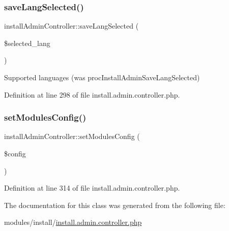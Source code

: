 \subsubsection{\texorpdfstring{save\+Lang\+Selected()}{saveLangSelected()}}
{\footnotesize\ttfamily install\+Admin\+Controller\+::save\+Lang\+Selected (\begin{DoxyParamCaption}\item[{}]{\$selected\+\_\+lang }\end{DoxyParamCaption})}



Supported languages (was proc\+Install\+Admin\+Save\+Lang\+Selected) 



Definition at line 298 of file install.\+admin.\+controller.\+php.

\hypertarget{classinstallAdminController_ab19d26e4473d9b40a494d5b1f1dbb996}{}\label{classinstallAdminController_ab19d26e4473d9b40a494d5b1f1dbb996} 
\subsubsection{\texorpdfstring{set\+Modules\+Config()}{setModulesConfig()}}
{\footnotesize\ttfamily install\+Admin\+Controller\+::set\+Modules\+Config (\begin{DoxyParamCaption}\item[{}]{\$config }\end{DoxyParamCaption})}



Definition at line 314 of file install.\+admin.\+controller.\+php.



The documentation for this class was generated from the following file\+:\begin{DoxyCompactItemize}
\item 
modules/install/\hyperlink{install_8admin_8controller_8php}{install.\+admin.\+controller.\+php}\end{DoxyCompactItemize}

